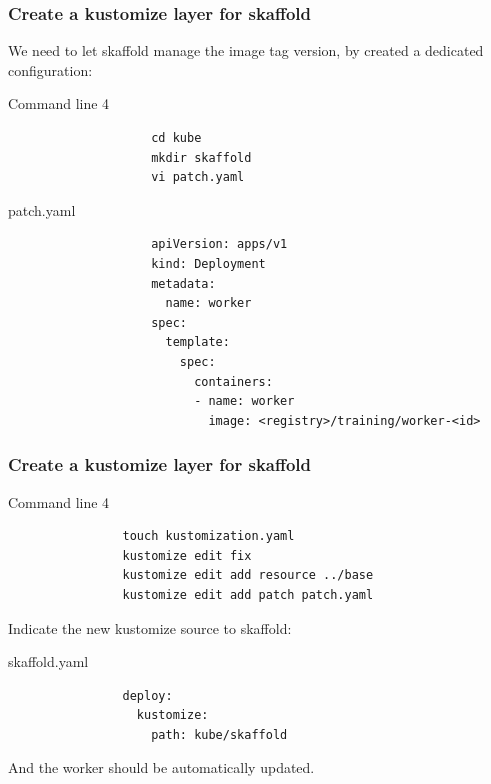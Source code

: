	\begin{frame}[fragile]
		\frametitle{Create a kustomize layer for skaffold}
		We need to let skaffold manage the image tag version, by created a dedicated configuration:
		\begin{block}{Command line 4}
			\begin{small}
				\begin{verbatim}
					cd kube
					mkdir skaffold
					vi patch.yaml
				\end{verbatim}
			\end{small}
		\end{block}
		
		\begin{block}{patch.yaml}
			\begin{tiny}
				\begin{verbatim}
					apiVersion: apps/v1
					kind: Deployment
					metadata:
					  name: worker
					spec:
					  template:
					    spec:
					      containers:
					      - name: worker
					        image: <registry>/training/worker-<id>
				\end{verbatim}
			\end{tiny}
		\end{block}
	\end{frame}
	
	\begin{frame}[fragile]
		\frametitle{Create a kustomize layer for skaffold}

		\begin{block}{Command line 4}
			\begin{verbatim}
				touch kustomization.yaml
				kustomize edit fix
				kustomize edit add resource ../base
				kustomize edit add patch patch.yaml
			\end{verbatim}
		\end{block}
		Indicate the new kustomize source to skaffold:
		\begin{block}{skaffold.yaml}
			\begin{verbatim}
				deploy:
				  kustomize:
				    path: kube/skaffold
			\end{verbatim}
		\end{block}
		And the worker should be automatically updated.
		
	\end{frame}
	
